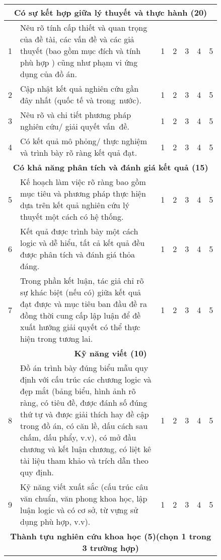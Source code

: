     \begin{longtable}{| m{0.035\linewidth} | m{0.7\linewidth} | m{0.02\linewidth} | m{0.02\linewidth}| m{0.02\linewidth}|  m{0.02\linewidth} | m{0.02\linewidth} |}
    \hline
    \multicolumn{7}{|c|}{\textbf{Có sự kết hợp giữa lý thuyết và thực hành (20)}} \\ \hline
    1 & Nêu rõ tính cấp thiết và quan trọng của đề tài, các vấn đề và các giả thuyết (bao gồm mục đích và tính phù hợp ) cũng như phạm vi ứng dụng của đồ án. & 1 & 2 & 3 & 4 & 5 \\ \hline
    2 & Cập nhật kết quả nghiên cứu gần đây nhất (quốc tế và trong~nước). & 1 & 2 & 3 & 4 & 5 \\ \hline   
	3 & Nêu rõ và chi tiết phương pháp nghiên cứu/ giải quyết vấn~đề.  & 1 & 2 & 3 & 4 & 5 \\ \hline 
	4 & Có kết quả mô phỏng/ thực nghiệm và trình bày rõ ràng kết quả đạt.  & 1 & 2 & 3 & 4 & 5 \\ \hline 
	\multicolumn{7}{|c|}{\textbf{Có khả năng phân tích và đánh giá kết quả (15)}} \\ \hline
	5 & Kế hoạch làm việc rõ ràng bao gồm mục tiêu và phương pháp thực hiện dựa trên kết quả nghiên cứu lý thuyết một cách có hệ thống. & 1 & 2 & 3 & 4 & 5 \\ \hline
    6 & Kết quả được trình bày một cách logic và dễ hiểu, tất cả kết quả đều được phân tích và đánh giá thỏa đáng. & 1 & 2 & 3 & 4 & 5 \\ \hline   
	7 & Trong phần kết luận, tác giả chỉ rõ sự khác biệt (nếu có) giữa kết quả đạt được và mục tiêu ban đầu đề ra đồng thời cung cấp lập luận để đề xuất hướng giải quyết có thể thực hiện trong tương lai.  & 1 & 2 & 3 & 4 & 5 \\ \hline 
	\multicolumn{7}{|c|}{\textbf{Kỹ năng viết (10)}} \\ \hline
	8 & Đồ án trình bày đúng biểu mẫu quy định với cấu trúc các chương logic và đẹp mắt (bảng biểu, hình ảnh rõ ràng, có tiêu đề, được đánh số đúng thứ tự và được giải thích hay đề cập trong đồ án, có căn lề, dấu cách sau chấm, dấu phẩy, v.v), có mở đầu chương và kết luận chương, có liệt kê tài liệu tham khảo và trích dẫn theo quy định. & 1 & 2 & 3 & 4 & 5 \\ \hline
    9 & Kỹ năng viết xuất sắc (cấu trúc câu văn chuẩn, văn phong khoa học, lập luận logic và có cơ sở, từ vựng sử dụng phù hợp, v.v). & 1 & 2 & 3 & 4 & 5 \\ \hline   
    \multicolumn{7}{|c|}{\textbf{Thành tựu nghiên cứu khoa học (5)(chọn 1 trong 3 trường hợp)}} \\ \hline

\end{longtable}

